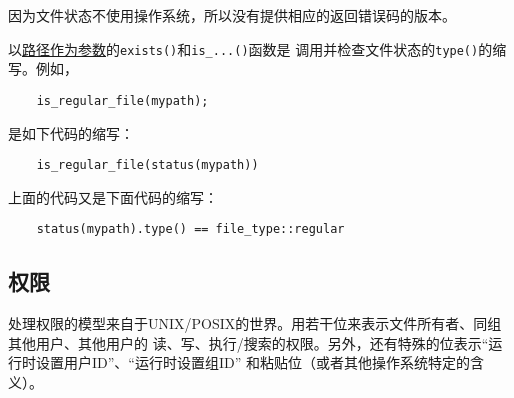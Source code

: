 因为文件状态不使用操作系统，所以没有提供相应的返回错误码的版本。

以\hyperref[ch20.4.1]{路径作为参数}的\texttt{exists()}和\texttt{is\_...()}函数是
调用并检查文件状态的\texttt{type()}的缩写。例如，
\begin{lstlisting}
    is_regular_file(mypath);
\end{lstlisting}
是如下代码的缩写：
\begin{lstlisting}
    is_regular_file(status(mypath))
\end{lstlisting}
上面的代码又是下面代码的缩写：
\begin{lstlisting}
    status(mypath).type() == file_type::regular
\end{lstlisting}

\subsection{权限}\label{ch20.4.3}
处理权限的模型来自于UNIX/POSIX的世界。用若干位来表示文件所有者、同组其他用户、其他用户的
读、写、执行/搜索的权限。另外，还有特殊的位表示“运行时设置用户ID”、“运行时设置组ID”
和粘贴位（或者其他操作系统特定的含义）。

